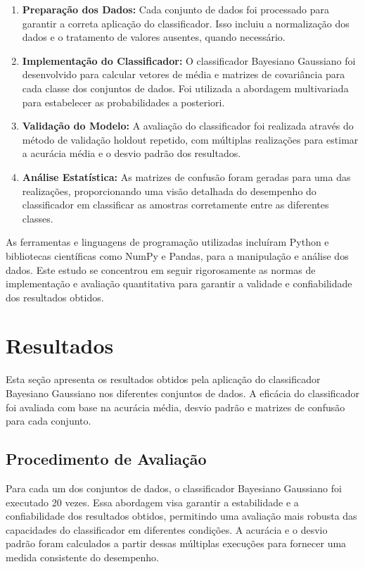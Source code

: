 \documentclass[12pt, a4paper]{report}
\begin{document}
\begin{enumerate}
    \item \textbf{Preparação dos Dados:} Cada conjunto de dados foi processado para garantir a correta aplicação do classificador. Isso incluiu a normalização dos dados e o tratamento de valores ausentes, quando necessário.
    \item \textbf{Implementação do Classificador:} O classificador Bayesiano Gaussiano foi desenvolvido para calcular vetores de média e matrizes de covariância para cada classe dos conjuntos de dados. Foi utilizada a abordagem multivariada para estabelecer as probabilidades a posteriori.
    \item \textbf{Validação do Modelo:} A avaliação do classificador foi realizada através do método de validação holdout repetido, com múltiplas realizações para estimar a acurácia média e o desvio padrão dos resultados.
    \item \textbf{Análise Estatística:} As matrizes de confusão foram geradas para uma das realizações, proporcionando uma visão detalhada do desempenho do classificador em classificar as amostras corretamente entre as diferentes classes.
\end{enumerate}

As ferramentas e linguagens de programação utilizadas incluíram Python e bibliotecas científicas como NumPy e Pandas, para a manipulação e análise dos dados. Este estudo se concentrou em seguir rigorosamente as normas de implementação e avaliação quantitativa para garantir a validade e confiabilidade dos resultados obtidos.

\chapter{Resultados}

Esta seção apresenta os resultados obtidos pela aplicação do classificador Bayesiano Gaussiano nos diferentes conjuntos de dados. A eficácia do classificador foi avaliada com base na acurácia média, desvio padrão e matrizes de confusão para cada conjunto.

\section{Procedimento de Avaliação}

Para cada um dos conjuntos de dados, o classificador Bayesiano Gaussiano foi executado 20 vezes. Essa abordagem visa garantir a estabilidade e a confiabilidade dos resultados obtidos, permitindo uma avaliação mais robusta das capacidades do classificador em diferentes condições. A acurácia e o desvio padrão foram calculados a partir dessas múltiplas execuções para fornecer uma medida consistente do desempenho.
\end{document}
